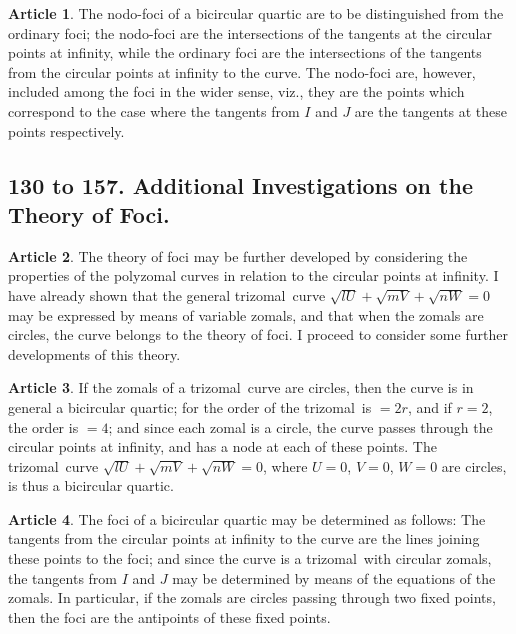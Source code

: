 \documentclass[11pt,a4paper]{article}
\theoremstyle{definition}
\newtheorem{art}{Article}
\newcommand{\trizomal}{trizomal}
\begin{document}
\begin{art}
The nodo-foci of a bicircular quartic are to be distinguished from the ordinary foci; the nodo-foci are the intersections of the tangents at the circular points at infinity, while the ordinary foci are the intersections of the tangents from the circular points at infinity to the curve. The nodo-foci are, however, included among the foci in the wider sense, viz., they are the points which correspond to the case where the tangents from $I$ and $J$ are the tangents at these points respectively.
\end{art}

\subsection{130 to 157. Additional Investigations on the Theory of Foci.}

\begin{art}
The theory of foci may be further developed by considering the properties of the polyzomal curves in relation to the circular points at infinity. I have already shown that the general \trizomal\ curve $\sqrt{lU} + \sqrt{mV} + \sqrt{nW} = 0$ may be expressed by means of variable zomals, and that when the zomals are circles, the curve belongs to the theory of foci. I proceed to consider some further developments of this theory.
\end{art}

\begin{art}
If the zomals of a \trizomal\ curve are circles, then the curve is in general a bicircular quartic; for the order of the \trizomal\ is $= 2r$, and if $r = 2$, the order is $= 4$; and since each zomal is a circle, the curve passes through the circular points at infinity, and has a node at each of these points. The \trizomal\ curve $\sqrt{lU} + \sqrt{mV} + \sqrt{nW} = 0$, where $U = 0$, $V = 0$, $W = 0$ are circles, is thus a bicircular quartic.
\end{art}

\begin{art}
The foci of a bicircular quartic may be determined as follows: The tangents from the circular points at infinity to the curve are the lines joining these points to the foci; and since the curve is a \trizomal\ with circular zomals, the tangents from $I$ and $J$ may be determined by means of the equations of the zomals. In particular, if the zomals are circles passing through two fixed points, then the foci are the antipoints of these fixed points.
\end{art}
\end{document}
